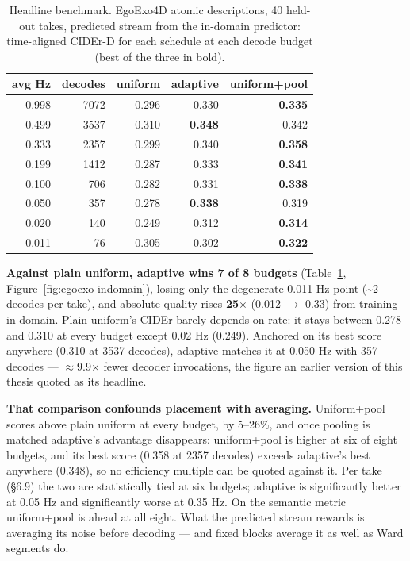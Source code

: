 \begin{table}[htbp]
\centering\small
\caption{Headline benchmark. EgoExo4D atomic descriptions, 40 held-out takes, predicted stream from the in-domain predictor: time-aligned CIDEr-D for each schedule at each decode budget (best of the three in bold).}
\label{tab:egoexo-indomain}
\begin{tabular}{rrrrr}
\toprule
\textbf{avg Hz} & \textbf{decodes} & \textbf{uniform} & \textbf{adaptive} & \textbf{uniform+pool} \\
\midrule
0.998 & 7072 & 0.296 & 0.330 & \textbf{0.335} \\
0.499 & 3537 & 0.310 & \textbf{0.348} & 0.342 \\
0.333 & 2357 & 0.299 & 0.340 & \textbf{0.358} \\
0.199 & 1412 & 0.287 & 0.333 & \textbf{0.341} \\
0.100 & 706 & 0.282 & 0.331 & \textbf{0.338} \\
0.050 & 357 & 0.278 & \textbf{0.338} & 0.319 \\
0.020 & 140 & 0.249 & 0.312 & \textbf{0.314} \\
0.011 & 76 & 0.305 & 0.302 & \textbf{0.322} \\
\bottomrule
\end{tabular}
\end{table}

\textbf{Against plain uniform, adaptive wins 7 of 8 budgets} (Table~\ref{tab:egoexo-indomain}, Figure~\ref{fig:egoexo-indomain}), losing only the degenerate 0.011 Hz point (\textasciitilde{}2 decodes per take), and absolute quality rises \textbf{25$\times$} (0.012 $\rightarrow$ 0.33) from training in-domain. Plain uniform's CIDEr barely depends on rate: it stays between 0.278 and 0.310 at every budget except 0.02 Hz (0.249). Anchored on its best score anywhere (0.310 at 3537 decodes), adaptive matches it at 0.050 Hz with 357 decodes --- $\approx$9.9$\times$ fewer decoder invocations, the figure an earlier version of this thesis quoted as its headline.

\textbf{That comparison confounds placement with averaging.} Uniform+pool scores above plain uniform at every budget, by 5--26\%, and once pooling is matched adaptive's advantage disappears: uniform+pool is higher at six of eight budgets, and its best score (0.358 at 2357 decodes) exceeds adaptive's best anywhere (0.348), so no efficiency multiple can be quoted against it. Per take (\S6.9) the two are statistically tied at six budgets; adaptive is significantly better at 0.05 Hz and significantly worse at 0.35 Hz. On the semantic metric uniform+pool is ahead at all eight. What the predicted stream rewards is averaging its noise before decoding --- and fixed blocks average it as well as Ward segments do.

